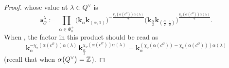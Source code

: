 \documentclass[11pt]{article}
\numberwithin{equation}{section}
\numberwithin{equation}{section}
\begin{document}
\begin{proof}
whose value at $\lambda\in Q^\vee$ is
\[
\mathfrak{s}^\lambda_\mathcal{O}:=\prod_{\alpha\in\Phi_0^+}\bigl(\mathbf{k}_{\alpha}\mathbf{k}_{(\alpha,1)}\bigr)^{-\frac{\chi_e(\alpha(c^\mathcal{O}))\alpha(\lambda)}{2}}
\bigl(\mathbf{k}_{\frac{\alpha}{2}}\mathbf{k}_{(\frac{\alpha}{2},\frac{1}{2})}\bigr)^{\frac{\chi_o(\alpha(c^\mathcal{O}))\alpha(\lambda)}{2}}.
\]
When , the factor in this product should be read as
\[
\mathbf{k}_\alpha^{-\chi_e(\alpha(c^\mathcal{O}))\alpha(\lambda)}\,\mathbf{k}_{\frac{\alpha}{2}}^{\chi_o(\alpha(c^\mathcal{O}))\alpha(\lambda)}=
\mathbf{k}_{\alpha}^{(\chi_o(\alpha(c^\mathcal{O}))-\chi_e(\alpha(c^\mathcal{O})))\alpha(\lambda)}
\]
\big(recall that  when $\alpha\smash{\bigl(Q^\vee\bigr)}=\mathbb{Z}$\big).


\end{proof}
\end{document}
